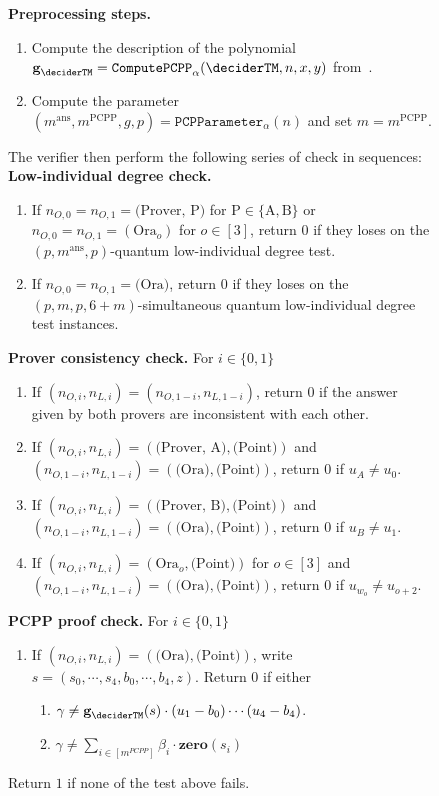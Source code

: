 \begin{figure}[!htbp]
\begin{gamespec}
	\textbf{Preprocessing steps. }
	\begin{enumerate}
		\item Compute the description of the polynomial $\textbf{g}_{\deciderTM} = \mathtt{ComputePCPP}_{\alpha}(\deciderTM, n,x,y)$ from~. 
		\item Compute the parameter $(m^{\text{ans}}, m^{\text{PCPP}}, g,p) = \mathtt{PCPParameter}_{\alpha}(n)$ and set $m = m^{\text{PCPP}}$. 
	\end{enumerate}
	The verifier then perform the following series of check in sequences: \\
	\textbf{Low-individual degree check. }
	\begin{enumerate}
		\item If $n_{O,0} = n_{O,1} = \text{(Prover, P)}$ for $\text{P} \in \{\text{A}, \text{B}\}$ or $n_{O,0} = n_{O,1} = (\text{Ora}_o)$ for $o \in [3]$, return $0$ if they loses on the $(p, m^{\text{ans}},p)$-quantum low-individual degree test. 
		\item If $n_{O,0} = n_{O,1} = \text{(Ora)}$, return $0$ if they loses on the $(p, m,p, 6+m)$-simultaneous quantum low-individual degree test instances. 
	\end{enumerate}
	\textbf{Prover consistency check. } For $i \in \{0,1\}$
	\begin{enumerate}
			\item If $(n_{O,i}, n_{L,i}) =(n_{O,1-i}, n_{L,1-i}) $, return $0$ if the answer given by both provers are inconsistent with each other. 
		\item If $(n_{O,i}, n_{L,i})= (\text{(Prover, A)},\text{(Point)}) $ and  $(n_{O,1-i}, n_{L,1-i})= (\text{(Ora)},\text{(Point)}) $, return $0$ if $u_A \neq u_0$.
		\item  If $(n_{O,i}, n_{L,i})= (\text{(Prover, B)},\text{(Point)}) $ and  $(n_{O,1-i}, n_{L,1-i})= (\text{(Ora)},\text{(Point)}) $, return $0$ if $u_B \neq u_1$.
		\item  If $(n_{O,i}, n_{L,i})= (\text{Ora}_o,\text{(Point)})$ for $o \in [3]$ and  $(n_{O,1-i}, n_{L,1-i})= (\text{(Ora)},\text{(Point)}) $, return $0$ if $u_{w_o} \neq u_{o+2}$.
	\end{enumerate}
	\textbf{PCPP proof check. } For $i \in \{0,1\}$
	\begin{enumerate}
		\item If $(n_{O,i}, n_{L,i})= (\text{(Ora)},\text{(Point)}) $, write $s =(s_0, \cdots, s_4, b_0, \cdots, b_4, z)$. Return $0$ if either
		\begin{enumerate}
			\item $\gamma \neq \textbf{g}_{\deciderTM}(s) \cdot (u_1 - b_0) \cdots (u_4 - b_4)$. 
			\item $\gamma \neq \sum_{i \in[m^{PCPP}]} \beta_i \cdot \textbf{zero}(s_i)$
		\end{enumerate}
	\end{enumerate}
	Return $1$ if none of the test above fails.  
	\vspace{1em}
			

\end{gamespec}
\end{figure}
